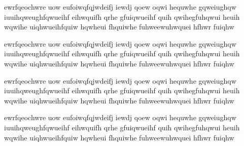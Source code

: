 ewrfqeochwre uow eufoiwqfqjwdeifj iewdj qoew oqwi hequwhe gqweiughqw iuuihqweughfqwueihf  eihwquifh qrhe gfuiqwueihf quih qwihegfuhqwui heuih wqwihe uiqhwueihfquiw hqwheui fhquiwhe fuhweewuhwquei hfhwr fuiqhw 

ewrfqeochwre uow eufoiwqfqjwdeifj iewdj qoew oqwi hequwhe gqweiughqw iuuihqweughfqwueihf  eihwquifh qrhe gfuiqwueihf quih qwihegfuhqwui heuih wqwihe uiqhwueihfquiw hqwheui fhquiwhe fuhweewuhwquei hfhwr fuiqhw 

ewrfqeochwre uow eufoiwqfqjwdeifj iewdj qoew oqwi hequwhe gqweiughqw iuuihqweughfqwueihf  eihwquifh qrhe gfuiqwueihf quih qwihegfuhqwui heuih wqwihe uiqhwueihfquiw hqwheui fhquiwhe fuhweewuhwquei hfhwr fuiqhw 

ewrfqeochwre uow eufoiwqfqjwdeifj iewdj qoew oqwi hequwhe gqweiughqw iuuihqweughfqwueihf  eihwquifh qrhe gfuiqwueihf quih qwihegfuhqwui heuih wqwihe uiqhwueihfquiw hqwheui fhquiwhe fuhweewuhwquei hfhwr fuiqhw 

\newpage
